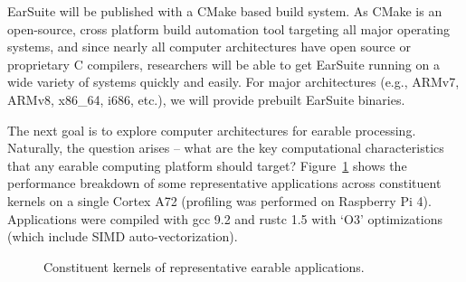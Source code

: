     EarSuite will be published with a CMake based build system.  As CMake
    is an open-source, cross platform build automation tool targeting all
    major operating systems, and since nearly all computer architectures
    have open source or proprietary C compilers, researchers will be able
    to get EarSuite running on a wide variety of systems quickly and easily.
    For major architectures (e.g., ARMv7, ARMv8, x86\_64, i686, etc.),
    we will provide prebuilt EarSuite binaries.

The next goal is to explore computer architectures for earable processing. Naturally, the question arises --
what are the key computational characteristics that any earable computing platform should target?
 Figure~\ref{fig:kernels_breakdown} shows the performance breakdown of some representative applications
 across constituent kernels on a single Cortex A72 (profiling was performed on Raspberry Pi 4).  Applications were
 compiled with gcc 9.2 and rustc 1.5 with `O3' optimizations (which include
 SIMD auto-vectorization).
 
 
 
\begin{figure}[h]
  \centering
  
    \scalebox{0.65}{}
  \caption{\small Constituent kernels of representative earable applications.}
    \label{fig:kernels_breakdown}
\end{figure}


